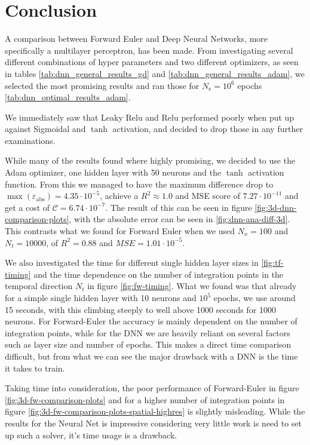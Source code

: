 \section{Conclusion}
A comparison between Forward Euler and Deep Neural Networks, more specifically a multilayer perceptron, has been made. From investigating several different combinations of hyper parameters and two different optimizers, as seen in tables \ref{tab:dnn_general_results_gd} and \ref{tab:dnn_general_results_adam}, we selected the most promising results and ran those for $N_\mathrm{e}=10^6$ epochs \ref{tab:dnn_optimal_results_adam}.

We immediately saw that Leaky Relu and Relu performed poorly when put up against Sigmoidal and $\tanh$ activation, and decided to drop those in any further examinations.

While many of the results found where highly promising, we decided to use the Adam optimizer, one hidden layer with 50 neurons and the $\tanh$ activation function. From this we managed to have the maximum difference drop to $\max(\varepsilon_\mathrm{abs})=4.35\cdot 10^{-5}$, achieve a $R^2 \approx 1.0$ and MSE score of $7.27\cdot 10^{-11}$ and get a cost of $\mathcal{C} = 6.74 \cdot 10^{-7}$. The result of this can be seen in figure \ref{fig:3d-dnn-comparison-plots}, with the absolute error can be seen in \ref{fig:dnn-ana-diff-3d}. This contrasts what we found for Forward Euler when we used $N_x=100$ and $N_t=10000$, of $R^2=0.88$ and $MSE=1.01\cdot 10^{-5}$.

We also investigated the time for different single hidden layer sizes in \ref{fig:tf-timing} and the time dependence on the number of integration points in the temporal direction $N_t$ in figure \ref{fig:fw-timing}. What we found was that already for a simple single hidden layer with 10 neurons and $10^5$ epochs, we use around 15 seconds, with this climbing steeply to well above 1000 seconds for 1000 neurons. For Forward-Euler the accuracy is mainly dependent on the number of integration points, while for the DNN we are heavily reliant on several factors such as layer size and number of epochs. This makes a direct time comparison difficult, but from what we can see the major drawback with a DNN is the time it takes to train.

Taking time into consideration, the poor performance of Forward-Euler in figure \ref{fig:3d-fw-comparison-plots} and for a higher number of integration points in figure \ref{fig:3d-fw-comparison-plots-spatial-highres} is slightly misleading. While the results for the Neural Net is impressive considering very little work is need to set up such a solver, it's time usage is a drawback.

